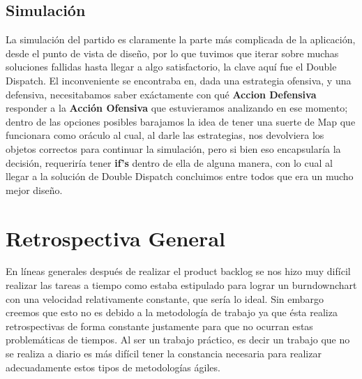 \subsection{Simulación}

La simulación del partido es claramente la parte más complicada de la aplicación, desde el punto de vista de diseño, por lo que tuvimos que iterar sobre muchas soluciones fallidas hasta llegar a algo satisfactorio, la clave aquí fue el Double Dispatch. El inconveniente se encontraba en, dada una estrategia ofensiva, y una defensiva, necesitabamos saber exáctamente con qué \textbf{Accion Defensiva} responder a la \textbf{Acción Ofensiva} que estuvieramos analizando en ese momento; dentro de las opciones posibles barajamos la idea de tener una suerte de Map que funcionara como oráculo al cual, al darle las estrategias, nos devolviera los objetos correctos para continuar la simulación, pero si bien eso encapsularía la decisión, requeriría tener \textbf{if's} dentro de ella de alguna manera, con lo cual al llegar a la solución de Double Dispatch concluimos entre todos que era un mucho mejor diseño.


\section{Retrospectiva General}
En líneas generales después de realizar el product backlog se nos hizo muy difícil
realizar las tareas a tiempo como estaba estipulado para lograr un burndownchart
con una velocidad relativamente constante, que sería lo ideal. 
Sin embargo creemos que esto no es debido a la metodología de trabajo ya que 
ésta realiza retrospectivas de forma constante justamente para que 
no ocurran estas problemáticas de tiempos.
Al ser un trabajo práctico, es decir un trabajo que no se realiza a diario 
es más difícil tener la constancia necesaria
para realizar adecuadamente estos tipos de metodologías ágiles.
